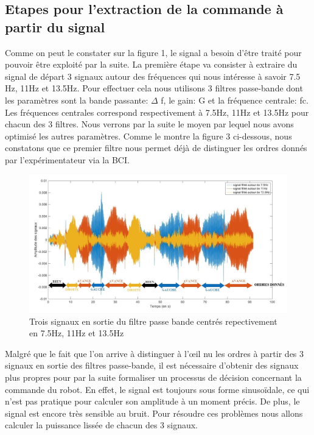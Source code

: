 \documentclass[11pt]{article}
\begin{document}
\cleardoublepage


\subsection{Etapes pour l'extraction de la commande à partir du signal}

Comme on peut le constater sur la figure 1, le signal a besoin d'être traité pour pouvoir être exploité par la suite. La première étape va consister à extraire du signal de départ 3 signaux autour des fréquences qui nous intéresse à savoir 7.5 Hz, 11Hz et 13.5Hz. Pour effectuer cela nous utilisons 3 filtres passe-bande dont les paramètres sont la bande passante: $\Delta$ f, le gain: G et la fréquence centrale: fc. Les fréquences centrales correspond respectivement à 7.5Hz, 11Hz et 13.5Hz pour chacun des 3 filtres. Nous verrons par la suite le moyen par lequel nous avons optimisé les autres paramètres. Comme le montre la figure 3 ci-dessous, nous constatons que ce premier filtre nous permet déjà de distinguer les ordres donnés par l'expérimentateur via la BCI.

\begin{figure}[!h]
	\includegraphics[scale=0.75]{images/Sigauxfiltreslables.jpg}
	\caption{Trois signaux en sortie du filtre passe bande centrés repectivement en 7.5Hz, 11Hz et 13.5Hz}
	\label{fig:duck}
\end{figure}

Malgré que le fait que l'on arrive à distinguer à l'œil nu les ordres à partir des 3 signaux en sortie des filtres passe-bande, il est nécessaire d'obtenir des signaux plus propres pour par la suite formaliser un processus de décision concernant la commande du robot. En effet, le signal est toujours sous forme sinusoïdale, ce qui n'est pas pratique pour calculer son amplitude à un moment précis. De plus, le signal est encore très sensible au bruit. Pour résoudre ces problèmes nous allons calculer la puissance lissée de chacun des 3 signaux.\\
\end{document}
